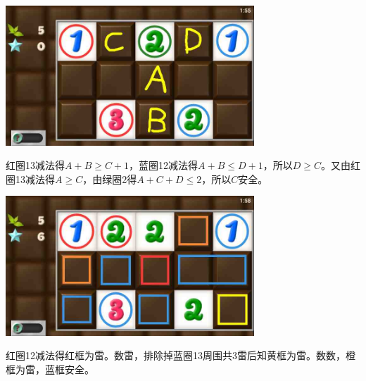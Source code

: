 \subsection{} %
\begin{center}
    \includegraphics[width=0.7\textwidth]{puzzlelow/89-1.jpg}
\end{center}
红圈13减法得$A+B\ge C+1$，蓝圈12减法得$A+B\le D+1$，所以$D\ge C$。又由红圈13减法得$A\ge C$，由绿圈2得$A+C+D\le 2$，所以$C$安全。
\begin{center}
    \includegraphics[width=0.7\textwidth]{puzzlelow/89-2.jpg}
\end{center}
红圈12减法得红框为雷。数雷，排除掉蓝圈13周围共3雷后知黄框为雷。数数，橙框为雷，蓝框安全。

